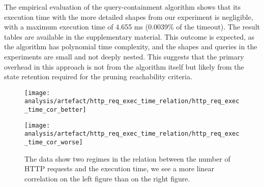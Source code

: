 The empirical evaluation of the query-containment algorithm shows that its execution time with the more detailed shapes from our experiment is negligible, with a maximum execution time of 4.655 ms (0.0039\% of the timeout).
The result tables are available in the supplementary material.
This outcome is expected, as the algorithm has polynomial time complexity, and the shapes and queries in the experiments are small and not deeply nested.
This suggests that the primary overhead in this approach is not from the algorithm itself but likely from the state retention required for the pruning reachability criteria.

\begin{figure}[htbp]
    \centering
    \begin{minipage}[t]{0.40\linewidth}
        \centering
        \texttt{[image: analysis/artefact/http\_req\_exec\_time\_relation/http\_req\_exec\_time\_cor\_better]}
        \label{fig:http_req_exec_time_cor_better}
    \end{minipage}
    \hspace{0.05\textwidth}
    \begin{minipage}[t]{0.40\linewidth}
        \centering
        \texttt{[image: analysis/artefact/http\_req\_exec\_time\_relation/http\_req\_exec\_time\_cor\_worse]}
        \label{fig:http_req_exec_time_cor_worse}
    \end{minipage}

    \caption{
        The data show two regimes in the relation between the number of HTTP requests and the execution time, 
        we see a more linear correlation on the left figure than on the right figure.
        }
    \label{fig:http_req_exec_time_cor}
\end{figure}


